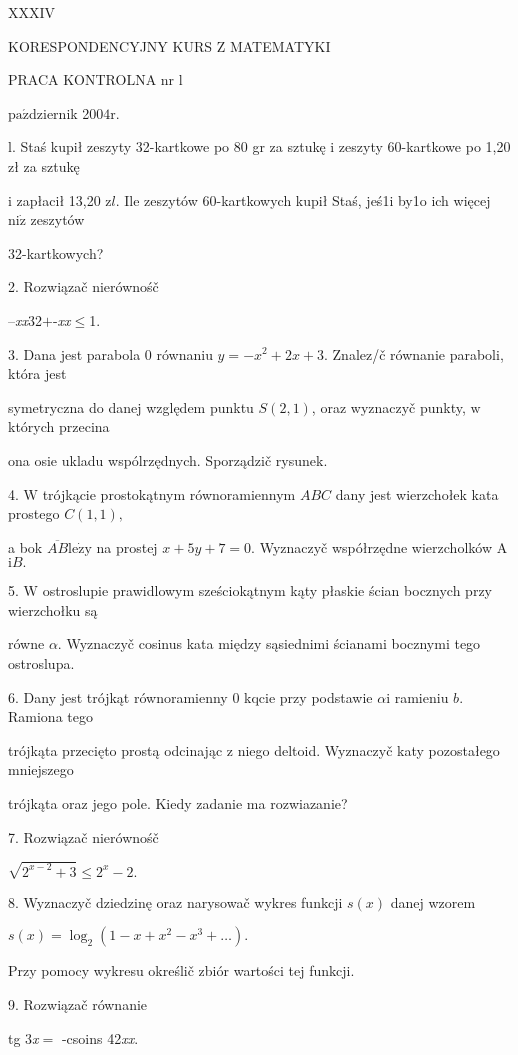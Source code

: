 \documentclass[a4paper,12pt]{article}
\begin{document}
XXXIV

KORESPONDENCYJNY KURS Z MATEMATYKI

PRACA KONTROLNA nr l

$\mathrm{p}\mathrm{a}\acute{\mathrm{z}}$dziernik 2$004\mathrm{r}.$

l. Staś kupił zeszyty 32-kartkowe po 80 gr za sztukę $\mathrm{i}$ zeszyty 60-kartkowe po 1,20 zł za sztukę

$\mathrm{i}$ zapłacił 13,20 $\mathrm{z}l$. Ile zeszytów 60-kartkowych kupił Staś, jeś1i by1o ich więcej $\mathrm{n}\mathrm{i}\dot{\mathrm{z}}$ zeszytów

32-kartkowych?

2. Rozwiązač nierównośč

--{\it xx}32$+$-{\it xx}$\leq$1.

3. Dana jest parabola $0$ równaniu $y = -x^{2}+2x+3$. Znalez/č równanie paraboli, która jest

symetryczna do danej względem punktu $S(2,1)$, oraz wyznaczyč punkty, $\mathrm{w}$ których przecina

ona osie ukladu wspólrzędnych. Sporządzič rysunek.

4. $\mathrm{W}$ trójkącie prostokątnym równoramiennym $ABC$ dany jest wierzchołek kata prostego $C(1,1),$

a bok $\overline{AB}\mathrm{l}\mathrm{e}\dot{\mathrm{z}}\mathrm{y}$ na prostej $x+5y+7=0$. Wyznaczyč współrzędne wierzcholków A $\mathrm{i}B.$

5. $\mathrm{W}$ ostroslupie prawidlowym sześciokątnym kąty płaskie ścian bocznych przy wierzchołku są

równe $\alpha$. Wyznaczyč cosinus kata między sąsiednimi ścianami bocznymi tego ostroslupa.

6. Dany jest trójkąt równoramienny $0$ kqcie przy podstawie $\alpha \mathrm{i}$ ramieniu $b$. Ramiona tego

trójkąta przecięto prostą odcinając $\mathrm{z}$ niego deltoid. Wyznaczyč katy pozostałego mniejszego

trójkąta oraz jego pole. Kiedy zadanie ma rozwiazanie?

7. Rozwiązač nierównośč

$\sqrt{2^{x-2}+3}\leq 2^{x}-2.$

8. Wyznaczyč dziedzinę oraz narysowač wykres funkcji $s(x)$ danej wzorem

$s(x)=\log_{2}(1-x+x^{2}-x^{3}+\ldots).$

Przy pomocy wykresu określič zbiór wartości tej funkcji.

9. Rozwiązač równanie

tg 3{\it x}$=$ -csoins 42{\it xx}.
\end{document}
